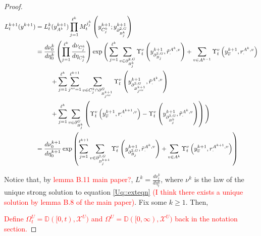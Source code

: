 \documentclass[12pt]{article}
\newcommand{\mb}{\mathbb}
\newcommand{\mc}{\mathcal}
\newcommand{\ov}{\overline}
\newcommand{\tr}{\textcolor{red}}
\newcommand{\cad}{\mb{D}}							%
\newcommand{\sta}{\mc{X}}							%
\newcommand{\gneigh}[2]{\partial^{#1}_{#2}}			%
\newcommand{\dgneigh}[2]{\partial^{2,#1}_{#2}}		%
\newcommand{\cl}[1]{\ov{#1}}						%
\newcommand{\indx}[1]{^{#1}}						%
\newcommand{\rate}{r}								%
\newcommand{\vind}[1]{_{#1}}						%
\newcommand{\vpara}[1]{^{#1}}						%
\newcommand{\stpara}[1]{_{#1}}						%
\newcommand{\tpara}[1]{_{#1}}						%
\newcommand{\gvpara}[2]{^{#1,#2}}					%
\newcommand{\psize}{\ell}							%
\newcommand{\Xg}{Y}									%
\newcommand{\brate}{\alt{\rate}}					%
\newcommand{\alt}[1]{\tilde{#1}}					%
\newcommand{\mm}{\nu}								%
\newcommand{\mmm}{\eta}								%
\newcommand{\ds}{\Upsilon}							%
\newcommand{\dense}{L}								%
\newcommand{\mdense}{M}								%
\newcommand{\xg}{y}									%
\newcommand{\jpara}[1]{^{#1}}						%
\begin{document}
\begin{proof}
\begin{align*}
\dense\indx{k+1}\tpara{t}(\xg\indx{k+1}) &= \dense\indx{k}\tpara{t}(\xg\indx{k+1}\vind{A\indx{k}})\prod_{j=1}^{\psize\indx{k}}\mdense\jpara{j\indx{k}_j}\tpara{t}\left(\xg\indx{k+1}\vind{C_j\indx{k}};\xg\indx{k+1}\vind{\dgneigh{G}{B\indx{k}_j}}\right)\\
&= \frac{d\mm\indx{k}\tpara{0}}{d\mmm\indx{k}\tpara{0}}\left(\prod_{j=1}^{\psize\indx{k}}\frac{d\mm\vind{C_j\indx{k}}}{d\mmm\vind{C_j\indx{k}}}\right)\exp\Bigg(\sum_{j=1}^{\psize\indx{k}}\sum_{v\in \dgneigh{G}{B_j\indx{k}}} \ds\vpara{v}\tpara{t}\left(\xg\indx{k+1}\vind{\dgneigh{G}{B_j}},\brate\gvpara{A\indx{k}}{v}\stpara{\cdot}\right) + \sum_{v \in A\indx{k-1}} \ds\vpara{v}\tpara{t}\left(\xg\indx{k+1}\vind{\cl{v}},\rate\gvpara{A\indx{k}}{v}\stpara{\cdot}\right)\\
&\hspace{24 pt} + \sum_{j=1}^{\psize\indx{k}}\sum_{j'''=1}^{\psize\indx{k+1}}\sum_{v \in C_j\indx{k}\cap\gneigh{G}{B_{j'''}\indx{k+1}}}\ds\vpara{v}\tpara{t}\left(\xg\indx{k+1}\vind{\dgneigh{G}{B_{j'''}\indx{k+1}}},\brate\gvpara{A\indx{k}}{v}\stpara{\cdot}\right)\\
&\hspace{24pt} + \sum_{j=1}^{\psize\indx{k}}\sum_{v \in \gneigh{G}{B_j\indx{k}}}\left(\ds\vpara{v}\tpara{t}\left(\xg\indx{k+1}\vind{\cl{v}},\rate\gvpara{A\indx{k+1}}{v}\stpara{\cdot}\right) - \ds\vpara{v}\tpara{t}\left(\xg\indx{k+1}\vind{\dgneigh{G}{B_j\indx{k}}},\brate\gvpara{A\indx{k}}{v}\stpara{\cdot}\right)\right)\Bigg)\\
&= \frac{d\mm\indx{k+1}\tpara{0}}{d\mmm\indx{k+1}\tpara{0}}\exp\left(\sum_{j=1}^{\psize\indx{k+1}}\sum_{v\in \dgneigh{G}{B_j\indx{k+1}}} \ds\vpara{v}\tpara{t}\left(\xg\indx{k+1}\vind{\dgneigh{G}{B_j}},\brate\gvpara{A\indx{k}}{v}\stpara{\cdot}\right) + \sum_{v \in A\indx{k}}\ds\vpara{v}\tpara{t}\left(\xg\vind{\cl{v}}\indx{k+1},\rate\gvpara{A\indx{k+1}}{v}\stpara{\cdot}\right)\right)
\end{align*}

Notice that, by \tr{lemma B.11 main paper?}, \(\dense\indx{k} = \frac{d\mm\indx{k}\tpara{t}}{d\mmm\indx{k}\tpara{t}}\), where \(\mm\indx{k}\) is the law of the unique strong solution to equation \eqref{Uq::exteqn} \tr{(I think there exists a unique solution by lemma B.8 of the main paper)}. Fix some \(k \geq 1\). Then,

\tr{Define \(\Omega\vpara{U}\tpara{t} = \cad([0,t),\sta^U)\) and \(\Omega\vpara{U} = \cad([0,\infty),\sta^U)\) back in the notation section.}


\end{proof}
\end{document}
